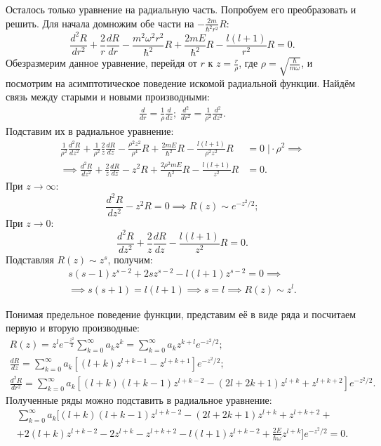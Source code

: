 Осталось только уравнение на радиальную часть. Попробуем его преобразовать и
решить. Для начала домножим обе части на $-\frac{2m}{\hbar^2r^2}R$:
\[
  \frac{d^2R}{dr^2} + \frac{2}{r}\frac{dR}{dr} - \frac{m^2\omega^2r^2}{\hbar^2}R + \frac{2mE}{\hbar^2}R - \frac{l(l+1)}{r^2}R = 0.
\]
Обезразмерим данное уравнение, перейдя от $r$ к $z = \frac{r}{\rho}$, где $\rho
  = \sqrt{\frac{\hbar}{m\omega}}$, и посмотрим на асимптотическое поведение
искомой радиальной функции. Найдём связь между старыми и новыми производными:
\begin{gather*}
  \frac{d}{dr} = \frac{1}{\rho}\frac{d}{dz}; \; \frac{d^2}{dr^2} = \frac{1}{\rho^2}\frac{d^2}{dz^2}.
\end{gather*}
Подставим их в радиальное уравнение:
\begin{align*}
  \frac{1}{\rho^2}\frac{d^2R}{dz^2} + \frac{1}{\rho^2}\frac{2}{z}\frac{dR}{dz} - \frac{\rho^2 z^2}{\rho^4}R + \frac{2mE}{\hbar^2}R - \frac{l(l+1)}{\rho^2z^2}R &=0 \; \Bigg| \cdot \rho^2 \implies \\
  \implies \frac{d^2R}{dz^2} + \frac{2}{z}\frac{dR}{dz} - z^2R + \frac{2\rho^2mE}{\hbar^2}R - \frac{l(l+1)}{z^2}R &= 0.
\end{align*}
При $z \to \infty$:
\[
  \frac{d^2R}{dz^2} - z^2R = 0 \implies R(z) \sim e^{-z^2/2};
\]
При $z \to 0$:
\[
  \frac{d^2R}{dz^2} + \frac{2}{z}\frac{dR}{dz} - \frac{l(l+1)}{z^2}R = 0.
\]
Подставляя $R(z) \sim z^s$, получим:
\begin{align*}
  s(s-1)z^{s-2} + 2sz^{s-2} - l(l+1)z^{s-2} = 0 \implies \\
  \implies s(s+1) = l(l+1) \implies s = l \implies R(z) \sim z^l.
\end{align*}

Понимая предельное поведение функции, представим её в виде ряда и посчитаем
первую и вторую производные:
\begin{gather*}
  R(z) = z^l e^{-\frac{z^2}{2}}\sum_{k=0}^\infty a_k z^k = \sum_{k=0}^\infty a_k z^{k+l} e^{-z^2/2}; \\
  \frac{dR}{dz} = \sum_{k=0}^\infty a_k\left[(l+k)z^{l+k-1} - z^{l+k+1}\right]e^{-z^2/2}; \\
  \frac{d^2R}{dr^2} = \sum_{k = 0}^\infty a_k \left[(l+k)(l+k-1)z^{l+k-2} - (2l+2k+1)z^{l+k} + z^{l+k+2}\right]e^{-z^2/2}.
\end{gather*}
Полученные ряды можно подставить в радиальное уравнение:
\begin{gather*}
  \sum_{k=0}^\infty a_k \biggl[ (l+k)(l+k-1)z^{l+k-2} - (2l+2k+1)z^{l+k}+z^{l+k+2} + \\
    + 2(l+k)z^{l+k-2} - 2z^{l+k} - z^{l+k+2} - l(l+1)z^{l+k-2} + \frac{2E}{\hbar\omega} z^{l+k} \biggr] e^{-z^2/2} = 0.
\end{gather*}

